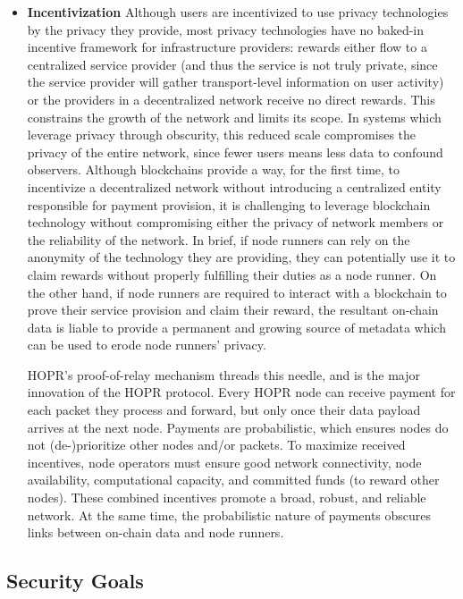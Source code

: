 \begin{itemize}
    \item \textbf{Incentivization}
          Although users are incentivized to use privacy technologies by the privacy they provide, most privacy technologies have no baked-in incentive framework for infrastructure providers: rewards either flow to a centralized service provider (and thus the service is not truly private, since the service provider will gather transport-level information on user activity) or the providers in a decentralized network receive no direct rewards. This constrains the growth of the network and limits its scope. In systems which leverage privacy through obscurity, this reduced scale compromises the privacy of the entire network, since fewer users means less data to confound observers. Although blockchains provide a way, for the first time, to incentivize a decentralized network without introducing a centralized entity responsible for payment provision, it is challenging to leverage blockchain technology without compromising either the privacy of network members or the reliability of the network. In brief, if node runners can rely on the anonymity of the technology they are providing, they can potentially use it to claim rewards without properly fulfilling their duties as a node runner. On the other hand, if node runners are required to interact with a blockchain to prove their service provision and claim their reward, the resultant on-chain data is liable to provide a permanent and growing source of metadata which can be used to erode node runners' privacy.

          HOPR's proof-of-relay mechanism threads this needle, and is the major innovation of the HOPR protocol. Every HOPR node can receive payment for each packet they process and forward, but only once their data payload arrives at the next node. Payments are probabilistic, which ensures nodes do not
          (de-)prioritize other nodes and/or packets. To maximize received incentives, node operators must ensure good network connectivity, node availability, computational capacity, and committed funds (to reward other nodes). These combined incentives promote a broad, robust, and reliable network. At the same time, the probabilistic nature of payments obscures links between on-chain data and node runners.
\end{itemize}

\subsection{Security Goals}
\label{sec:securitygoals}

